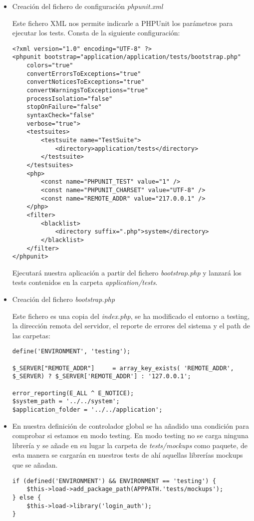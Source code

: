 \begin{itemize}
	\item Creación del fichero de configuración \emph{phpunit.xml}

		Este fichero XML nos permite indicarle a PHPUnit los parámetros para ejecutar los tests. Consta de la siguiente configuración:

				\begin{lstlisting}
<?xml version="1.0" encoding="UTF-8" ?>
<phpunit bootstrap="application/application/tests/bootstrap.php"
	colors="true"
	convertErrorsToExceptions="true"
	convertNoticesToExceptions="true"
	convertWarningsToExceptions="true"
	processIsolation="false"
	stopOnFailure="false"
	syntaxCheck="false"
	verbose="true">
	<testsuites>
		<testsuite name="TestSuite">
			<directory>application/tests</directory>
		</testsuite>
	</testsuites>
	<php>
		<const name="PHPUNIT_TEST" value="1" />
		<const name="PHPUNIT_CHARSET" value="UTF-8" />
		<const name="REMOTE_ADDR" value="217.0.0.1" />
	</php>
	<filter>
		<blacklist>
			<directory suffix=".php">system</directory>
		</blacklist>
	</filter>
</phpunit>
				\end{lstlisting}

		Ejecutará nuestra aplicación a partir del fichero \emph{bootstrap.php} y lanzará los tests contenidos en la carpeta \emph{application/tests}.

	\item Creación del fichero \emph{bootstrap.php}

		Este fichero es una copia del \emph{index.php}, se ha modificado el entorno a testing, la dirección remota del servidor, el reporte de errores del sistema y el path de las carpetas:
				\begin{lstlisting}
define('ENVIRONMENT', 'testing');

$_SERVER["REMOTE_ADDR"]     = array_key_exists( 'REMOTE_ADDR', $_SERVER) ? $_SERVER['REMOTE_ADDR'] : '127.0.0.1'; 

error_reporting(E_ALL ^ E_NOTICE);
$system_path = '../../system';
$application_folder = '../../application';
				\end{lstlisting}

	\item En nuestra definición de controlador global se ha añadido una condición para comprobar si estamos en modo testing. En modo testing no se carga ninguna librería y se añade en su lugar la carpeta de \emph{tests/mockups} como paquete, de esta manera se cargarán en nuestros tests de ahí aquellas librerías mockups que se añadan.

				\begin{lstlisting}
if (defined('ENVIRONMENT') && ENVIRONMENT == 'testing') {
    $this->load->add_package_path(APPPATH.'tests/mockups');
} else {
    $this->load->library('login_auth');
}
				\end{lstlisting}
\end{itemize}